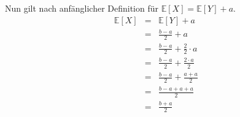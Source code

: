 \documentclass[twoside]{article}
\begin{document}
Nun gilt nach anfänglicher Definition für $\mathbb{E}[X] =\mathbb{E}[Y] + a$.
\begin{equation*}
    \begin{array}{rlll}
        \mathbb{E}[X]&=    &\mathbb{E}[Y] + a&\\
            &=    &\frac{b - a}{2} + a&\\
            &=    &\frac{b - a}{2} + \frac{2}{2} \cdot a&\\
            &=    &\frac{b - a}{2} + \frac{2\cdot a}{2}&\\
            &=    &\frac{b - a}{2} + \frac{a + a}{2}&\\
            &=    &\frac{b - a + a + a}{2}&\\
            &=    &\frac{b + a}{2}&\\
    \end{array}
\end{equation*}
\end{document}
